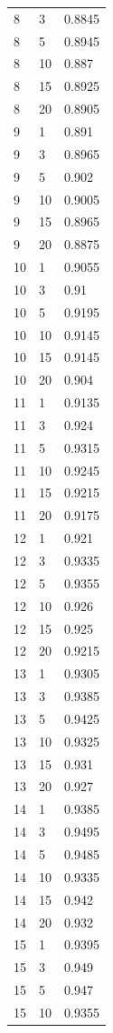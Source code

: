 \documentclass[runningheads]{llncs}
\begin{document}
\begin{longtable}{| p{} | p{} | p{} |}
8 & 3 & 0.8845 \\
8 & 5 & 0.8945 \\
8 & 10 & 0.887 \\
8 & 15 & 0.8925 \\
8 & 20 & 0.8905 \\
9 & 1 & 0.891 \\
9 & 3 & 0.8965 \\
9 & 5 & 0.902 \\
9 & 10 & 0.9005 \\
9 & 15 & 0.8965 \\
9 & 20 & 0.8875 \\
10 & 1 & 0.9055 \\
10 & 3 & 0.91 \\
10 & 5 & 0.9195 \\
10 & 10 & 0.9145 \\
10 & 15 & 0.9145 \\
10 & 20 & 0.904 \\
11 & 1 & 0.9135 \\
11 & 3 & 0.924 \\
11 & 5 & 0.9315 \\
11 & 10 & 0.9245 \\
11 & 15 & 0.9215 \\
11 & 20 & 0.9175 \\
12 & 1 & 0.921 \\
12 & 3 & 0.9335 \\
12 & 5 & 0.9355 \\
12 & 10 & 0.926 \\
12 & 15 & 0.925 \\
12 & 20 & 0.9215 \\
13 & 1 & 0.9305 \\
13 & 3 & 0.9385 \\
13 & 5 & 0.9425 \\
13 & 10 & 0.9325 \\
13 & 15 & 0.931 \\
13 & 20 & 0.927 \\
14 & 1 & 0.9385 \\
14 & 3 & 0.9495 \\
14 & 5 & 0.9485 \\
14 & 10 & 0.9335 \\
14 & 15 & 0.942 \\
14 & 20 & 0.932 \\
15 & 1 & 0.9395 \\
15 & 3 & 0.949 \\
15 & 5 & 0.947 \\
15 & 10 & 0.9355 \\

\end{longtable}
\end{document}
